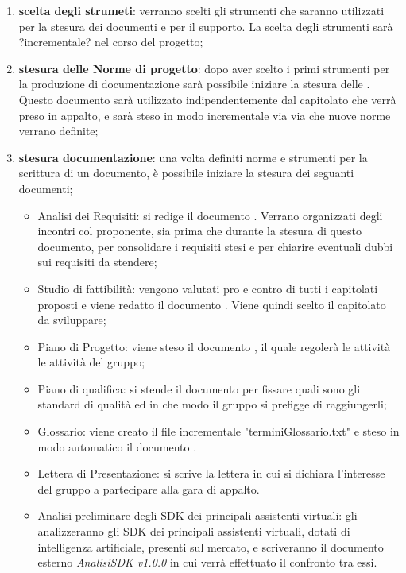 \documentclass[./PianoDiProgetto.tex]{subfiles}
\begin{document}
  \begin{enumerate}
		\item \textbf{scelta degli strumeti}: verranno scelti gli strumenti che saranno utilizzati per la stesura dei documenti e per il supporto. La scelta degli strumenti sarà ?incrementale? nel corso del progetto;
		\item \textbf{stesura delle Norme di progetto}: dopo aver scelto i primi strumenti per la produzione di documentazione sarà possibile iniziare la stesura delle \NPdocRR. Questo documento sarà utilizzato indipendentemente dal capitolato che verrà preso in appalto, e sarà steso in modo incrementale via via che nuove norme verrano definite;
		\item \textbf{stesura documentazione}: una volta definiti norme e strumenti per la scrittura di un documento, è possibile iniziare la stesura dei seguanti documenti;
    \begin{itemize}
      \item Analisi dei Requisiti: si redige il documento \ARdocRR. Verrano organizzati degli incontri col proponente, sia prima che durante la stesura di questo documento, per consolidare i requisiti stesi e per chiarire eventuali dubbi sui requisiti da stendere;
      \item Studio di fattibilità: vengono valutati pro e contro di tutti i capitolati proposti e viene redatto il documento \SFdocRR. Viene quindi scelto il capitolato da sviluppare;
      \item Piano di Progetto: viene steso il documento \PPdocRR, il quale regolerà le attività le attività del gruppo;
      \item Piano di qualifica: si stende il documento \PQdocRR per fissare quali sono gli standard di qualità ed in che modo il gruppo si prefigge di raggiungerli;
      \item Glossario: viene creato il file incrementale "terminiGlossario.txt" e steso in modo automatico il documento \GldocRR.
      \item Lettera di Presentazione: si scrive la lettera in cui si dichiara l'interesse del gruppo a partecipare alla gara di appalto.
      \item Analisi preliminare degli SDK dei principali assistenti virtuali: gli \ANP{} analizzeranno gli SDK dei principali assistenti virtuali, dotati di intelligenza artificiale, presenti sul mercato, e scriveranno il documento esterno \textit{AnalisiSDK v1.0.0} in cui verrà effettuato il confronto tra  essi.
    \end{itemize}
  \end{enumerate}
\end{document}
